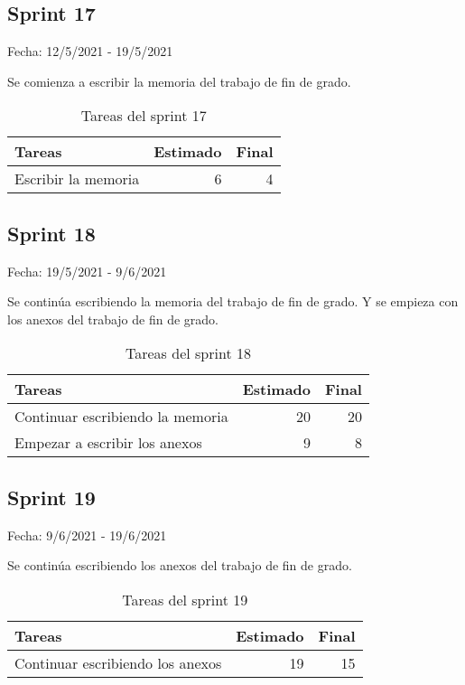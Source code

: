 \subsection{Sprint 17}

    Fecha: 12/5/2021 - 19/5/2021
    
    Se comienza a escribir la memoria del trabajo de fin de grado.
    
    \begin{table}[H]
    	 \begin{tabularx}{\linewidth}{X r r}
    	 	\toprule \textbf{Tareas} & \textbf{Estimado} & \textbf{Final}\\
    	 	\toprule
         	Escribir la memoria   & 6 & 4 \\
    	 	\bottomrule
    	 \end{tabularx}
    	 \caption{Tareas del sprint 17}
    \end{table}

\subsection{Sprint 18}

    Fecha: 19/5/2021 - 9/6/2021
    
    Se continúa  escribiendo  la memoria del trabajo de fin de grado. Y se empieza con los anexos del trabajo de fin de grado.
    
    \begin{table}[H]
    	 \begin{tabularx}{\linewidth}{X r r}
    	 	\toprule \textbf{Tareas} & \textbf{Estimado} & \textbf{Final}\\
    	 	\toprule
         	Continuar escribiendo la memoria   & 20 & 20 \\
		    Empezar a escribir los anexos & 9 & 8 \\
    	 	\bottomrule
    	 \end{tabularx}
    	 \caption{Tareas del sprint 18}
    \end{table}

\subsection{Sprint 19}

    Fecha: 9/6/2021 - 19/6/2021
    
    Se continúa  escribiendo  los anexos del trabajo de fin de grado. 
    \begin{table}[H]
    	 \begin{tabularx}{\linewidth}{X r r}
    	 	\toprule \textbf{Tareas} & \textbf{Estimado} & \textbf{Final}\\
    	 	\toprule
         	 Continuar escribiendo los anexos & 19 & 15 \\
		
    	 	\bottomrule
    	 \end{tabularx}
    	 \caption{Tareas del sprint 19}
    \end{table}

